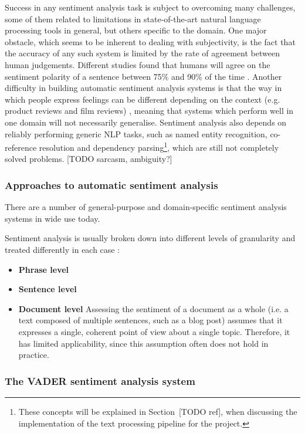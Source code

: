 \documentclass[bsc,frontabs,singlespacing,parskip, twoside]{infthesis}
\begin{document}
Success in any sentiment analysis task is subject to overcoming many challenges, some of them related to limitations in state-of-the-art natural language processing tools in general, but others specific to the domain. One major obstacle, which seems to be inherent to dealing with subjectivity, is the fact that the accuracy of any such system is limited by the rate of agreement between human judgements. Different studies found that humans will agree on the sentiment polarity of a sentence between 75\% and 90\% of the time \cite{godbole2007large, wilson2005recognizing}. Another difficulty in building automatic sentiment analysis systems is that the way in which people express feelings can be different depending on the context (e.g. product reviews and film reviews) \cite{varghesesurvey}, meaning that systems which perform well in one domain will not necessarily generalise. Sentiment analysis also depends on reliably performing generic NLP tasks, such as named entity recognition, co-reference resolution and dependency parsing\footnote{These concepts will be explained in Section~[TODO ref], when discussing the implementation of the text processing pipeline for the project.}, which are still not completely solved problems. [TODO sarcasm, ambiguity?]

\subsubsection{Approaches to automatic sentiment analysis}

There are a number of general-purpose and domain-specific sentiment analysis systems in wide use today.

Sentiment analysis is usually broken down into different levels of granularity and treated differently in each case \cite{liu2012sentiment}:
\begin{itemize}
	\item \textbf{Phrase level}
	\item \textbf{Sentence level} 
	\item \textbf{Document level} Assessing the sentiment of a document as a whole (i.e. a text composed of multiple sentences, such as a blog post) assumes that it expresses a single, coherent point of view about a single topic. Therefore, it has limited applicability, since this assumption often does not hold in practice.
\end{itemize}

\subsubsection{The VADER sentiment analysis system}
\end{document}
